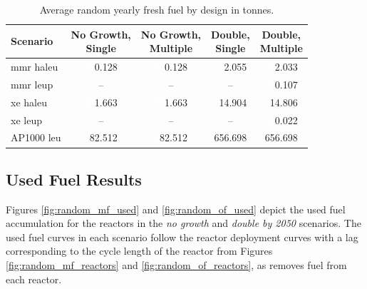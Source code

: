 \begin{table}[H]
    \centering
    \caption{Average random yearly fresh fuel by design in tonnes.}
    \label{tab:random_fresh_avg}
    \begin{tabular}{l c c c c}
       \toprule
       Scenario & \shortstack{No Growth,\\ Single} & \shortstack{No Growth,\\ Multiple} & \shortstack{Double,\\ Single} & \shortstack{Double,\\ Multiple}  \\
       \midrule
       \gls{mmr} \gls{haleu}   & \textcolor{white}{00}0.128    & \textcolor{white}{00}0.128   & \textcolor{white}{00}2.055    & \textcolor{white}{00}2.033    \\
       \gls{mmr} \gls{leup}    & --       & --      & --       & \textcolor{white}{00}0.107    \\
       \gls{xe} \gls{haleu}    & \textcolor{white}{00}1.663    & \textcolor{white}{00}1.663   & \textcolor{white}{0}14.904   & \textcolor{white}{0}14.806   \\
       \gls{xe} \gls{leup}     & --       & --      & --       & \textcolor{white}{00}0.022    \\
       AP1000 \gls{leu}        & \textcolor{white}{0}82.512   & \textcolor{white}{0}82.512  & 656.698  & 656.698  \\
       \bottomrule
    \end{tabular}
\end{table}





\subsection{Used Fuel Results}
\label{sec:random_used}

Figures \ref{fig:random_mf_used} and \ref{fig:random_of_used} depict the used fuel accumulation for the reactors in the \textit{no growth} and \textit{double by 2050} scenarios. The used fuel curves in each scenario follow the reactor deployment curves with a lag corresponding to the cycle length of the reactor from Figures \ref{fig:random_mf_reactors} and \ref{fig:random_of_reactors}, as \cyclus removes fuel from each reactor.


